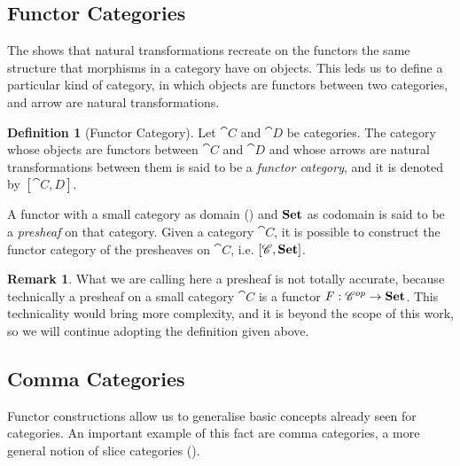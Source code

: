 \documentclass[a4paper, twoside,openright]{report}
\theoremstyle{plain}
\theoremstyle{definition}
\newtheorem{definition}[theorem]{Definition}
\newtheorem{remark}[theorem]{Remark}
\begin{document}
\subsection{Functor Categories}

The  shows that natural transformations recreate on the functors the same structure that morphisms in a category have on objects. This leds us to define a particular kind of category, in which objects are functors between two categories, and arrow are natural transformations.


\begin{definition}[Functor Category]\label{def:functor_category}
    Let $\cat C$ and $\cat D$ be categories. The category whose objects are functors between $\cat C$ and $\cat D$ and whose arrows are natural transformations between them is said to be a \emph{functor category}, and it is denoted by $[\cat{C, D}]$.
\end{definition}

A functor with a small category as domain () and $\mathbf{Set}$ as codomain is said to be a \emph{presheaf} on that category. Given a category $\cat C$, it is possible to construct the functor category of the presheaves on $\cat C$, i.e. $[\mathscr{C}, \mathbf{Set}]$.

\begin{remark}
    What we are calling here a presheaf is not totally accurate, because technically a presheaf on a small category $\cat C$ is a functor $F: \mathscr{C} ^{op} \rightarrow \mathbf{Set}$. This technicality would bring more complexity, and it is beyond the scope of this work, so we will continue adopting the definition given above.
\end{remark}

\subsection{Comma Categories}

Functor constructions allow us to generalise basic concepts already seen for categories. An important example of this fact are comma categories, a more general notion of slice categories ().

\end{document}
